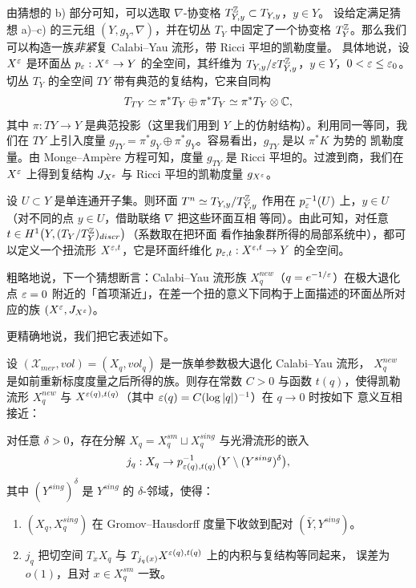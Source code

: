 由猜想的 b) 部分可知，可以选取 $\nabla$-协变格 $T^{\mathbb{Z}}_{Y,y}\subset T_{Y,y}$，$y\in Y$。
设给定满足猜想 a)--c) 的三元组 $(Y,g_Y,\nabla)$，并在切丛 $T_Y$ 中固定了一个协变格
$T^{\mathbb{Z}}_Y$。那么我们可以构造一族\emph{非紧}复 Calabi--Yau 流形，带 Ricci 平坦的凯勒度量。
具体地说，设 $X^{\varepsilon}$ 是环面丛 $p_\varepsilon:X^\varepsilon\to Y$ 的全空间，其纤维为
$T_{Y,y}/\varepsilon T^{\mathbb{Z}}_{Y,y}$，$y\in Y$，$0<\varepsilon\le\varepsilon_0$。切丛 $T_Y$ 的全空间 $TY$
带有典范的复结构，它来自同构
\[
  T_{TY}\simeq\pi^*T_Y\oplus\pi^*T_Y\simeq\pi^*T_Y\otimes\mathbb{C},
\]
其中 $\pi:TY\to Y$ 是典范投影（这里我们用到 $Y$ 上的仿射结构）。利用同一等同，我们在
$TY$ 上引入度量 $g_{TY}=\pi^*g_Y\oplus\pi^*g_Y$。容易看出，$g_{TY}$ 是以 $\pi^*K$ 为势的
凯勒度量。由 Monge--Ampère 方程可知，度量 $g_{TY}$ 是 Ricci 平坦的。过渡到商，我们在
$X^\varepsilon$ 上得到复结构 $J_{X^\varepsilon}$ 与 Ricci 平坦的凯勒度量 $g_{X^\varepsilon}$。

设 $U\subset Y$ 是单连通开子集。则环面 $T^n\simeq T_{Y,y}/T^{\mathbb{Z}}_{Y,y}$ 作用在
$p_\varepsilon^{-1}(U)$ 上，$y\in U$（对不同的点 $y\in U$，借助联络 $\nabla$ 把这些环面互相
等同）。由此可知，对任意 $t\in H^1\bigl(Y,(T_Y/T^{\mathbb{Z}}_Y)_{discr}\bigr)$（系数取在把环面
看作抽象群所得的局部系统中），都可以定义一个扭流形 $X^{\varepsilon,t}$，它是环面纤维化
$p_{\varepsilon,t}:X^{\varepsilon,t}\to Y$ 的全空间。

粗略地说，下一个猜想断言：Calabi--Yau 流形族 $X_q^{new}$（$q=e^{-1/\varepsilon}$）在极大退化点
$\varepsilon=0$ 附近的「首项渐近」，在差一个扭的意义下同构于上面描述的环面丛所对应的族
$(X^\varepsilon,J_{X^\varepsilon})$。

更精确地说，我们把它表述如下。

\begin{conj}
设 $(\mathcal{X}_{mer},vol)=(X_q,vol_q)$ 是一族单参数极大退化 Calabi--Yau 流形，
$X_q^{new}$ 是如前重新标度度量之后所得的族。则存在常数 $C>0$ 与函数 $t(q)$，使得凯勒流形
$X_q^{new}$ 与 $X^{\varepsilon(q),t(q)}$（其中 $\varepsilon(q)=C(\log|q|)^{-1}$）在 $q\to0$ 时按如下
意义互相接近：

对任意 $\delta>0$，存在分解 $X_q=X_q^{sm}\sqcup X_q^{sing}$ 与光滑流形的嵌入
\[
  j_q:X_q\to p_{\varepsilon(q),t(q)}^{-1}\bigl(Y\setminus(Y^{sing})^{\delta}\bigr),
\]
其中 $(Y^{sing})^{\delta}$ 是 $Y^{sing}$ 的 $\delta$-邻域，使得：
\begin{enumerate}[label=\textup{\alph*}),leftmargin=2em,itemsep=2pt]
  \item $(X_q,X_q^{sing})$ 在 Gromov--Hausdorff 度量下收敛到配对
        $(\bar Y,Y^{sing})$。
  \item $j_q$ 把切空间 $T_xX_q$ 与 $T_{j_q(x)}X^{\varepsilon(q),t(q)}$ 上的内积与复结构等同起来，
        误差为 $o(1)$，且对 $x\in X_q^{sm}$ 一致。
\end{enumerate}
\end{conj}

